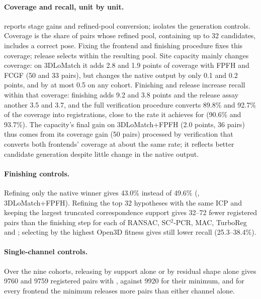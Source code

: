 \paragraph{Coverage and recall, unit by unit.}  reports stage gains and refined-pool conversion;  isolates the generation controls. Coverage is the share of pairs whose refined pool, containing up to 32 candidates, includes a correct pose. Fixing the frontend and finishing procedure fixes this coverage; release selects within the resulting pool. Site capacity mainly changes coverage: on 3DLoMatch it adds 2.8 and 1.9 points of coverage with FPFH and FCGF (50 and 33 pairs), but changes the native output by only 0.1 and 0.2 points, and by at most 0.5 on any cohort. Finishing and release increase recall within that coverage: finishing adds 9.2 and 3.8 points and the release assay another 3.5 and 3.7, and the full verification procedure converts 89.8\% and 92.7\% of the coverage into registrations, close to the rate it achieves for \ngr{} (90.6\% and 93.7\%). The capacity's final gain on 3DLoMatch+FPFH (2.0 points, 36 pairs) thus comes from its coverage gain (50 pairs) processed by verification that converts both frontends' coverage at about the same rate; it reflects better candidate generation despite little change in the native output.

\paragraph{Finishing controls.} Refining only the native winner gives 43.0\% instead of 49.6\% (\ls, 3DLoMatch+FPFH). Refining the top 32 hypotheses with the same ICP and keeping the largest truncated correspondence support gives 32--72 fewer registered pairs than the finishing step for each of RANSAC, SC$^2$-PCR, MAC, TurboReg and \ngr{}; selecting by the highest Open3D fitness gives still lower recall (25.3--38.4\%).

\paragraph{Single-channel controls.} Over the nine cohorts, releasing by support alone or by residual shape alone gives 9760 and 9759 registered pairs with \ls{}, against 9920 for their minimum, and for every frontend the minimum releases more pairs than either channel alone.

